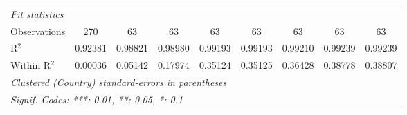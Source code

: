 \begin{table}[htbp]
\begin{tabular}{lcccccccc}
      \midrule
      \emph{Fit statistics}\\
      Observations                                                                     & 270      & 63       & 63              & 63              & 63              & 63              & 63              & 63\\  
      R$^2$                                                                            & 0.92381  & 0.98821  & 0.98980         & 0.99193         & 0.99193         & 0.99210         & 0.99239         & 0.99239\\  
      Within R$^2$                                                                     & 0.00036  & 0.05142  & 0.17974         & 0.35124         & 0.35125         & 0.36428         & 0.38778         & 0.38807\\  
      \midrule \midrule
      \multicolumn{9}{l}{\emph{Clustered (Country) standard-errors in parentheses}}\\
      \multicolumn{9}{l}{\emph{Signif. Codes: ***: 0.01, **: 0.05, *: 0.1}}\\
   \end{tabular}
\end{table}


